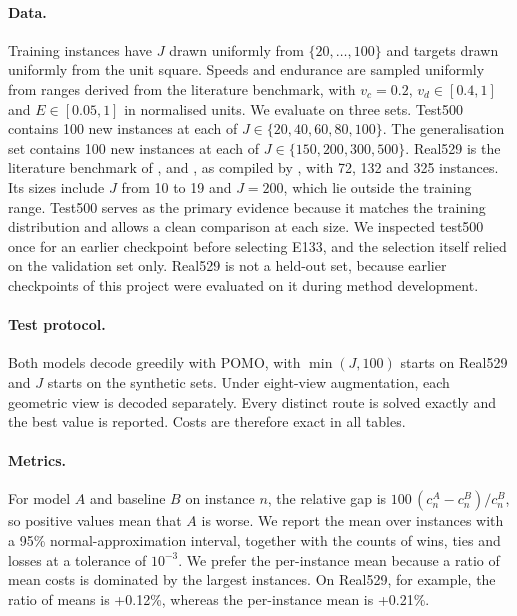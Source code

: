 \documentclass[preprint,12pt,authoryear]{elsarticle}
\begin{document}
\paragraph{Data.} Training instances have $J$ drawn uniformly from $\{20,\dots,100\}$ and targets drawn uniformly from the unit square. Speeds and endurance are sampled uniformly from ranges derived from the literature benchmark, with $v_{c} = 0.2$, $v_{d} \in [0.4, 1]$ and $E \in [0.05, 1]$ in normalised units. We evaluate on three sets. Test500 contains 100 new instances at each of $J \in \{20,40,60,80,100\}$. The generalisation set contains 100 new instances at each of $J \in \{150,200,300,500\}$. Real529 is the literature benchmark of \citet{gambella2018}, \citet{erdogan2021} and \citet{poikonen2020}, as compiled by \citet{li2025}, with 72, 132 and 325 instances. Its sizes include $J$ from 10 to 19 and $J = 200$, which lie outside the training range. Test500 serves as the primary evidence because it matches the training distribution and allows a clean comparison at each size. We inspected test500 once for an earlier checkpoint before selecting E133, and the selection itself relied on the validation set only. Real529 is not a held-out set, because earlier checkpoints of this project were evaluated on it during method development.

\paragraph{Test protocol.} Both models decode greedily with POMO, with $\min(J,100)$ starts on Real529 and $J$ starts on the synthetic sets. Under eight-view augmentation, each geometric view is decoded separately. Every distinct route is solved exactly and the best value is reported. Costs are therefore exact in all tables.

\paragraph{Metrics.} For model $A$ and baseline $B$ on instance $n$, the relative gap is $100\,(c^{A}_{n} - c^{B}_{n})/c^{B}_{n}$, so positive values mean that $A$ is worse. We report the mean over instances with a 95\% normal-approximation interval, together with the counts of wins, ties and losses at a tolerance of $10^{-3}$. We prefer the per-instance mean because a ratio of mean costs is dominated by the largest instances. On Real529, for example, the ratio of means is +0.12\%, whereas the per-instance mean is +0.21\%.
\end{document}
